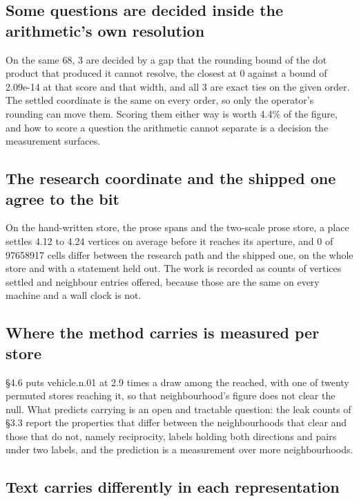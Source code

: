 \documentclass[10pt,letterpaper,twocolumn]{article}
\begin{document}
\subsection{Some questions are decided inside the arithmetic's own resolution}\label{some-questions-are-decided-inside-the-arithmetics-own-resolution}

On the same 68, 3 are decided by a gap that the rounding bound of the dot product that produced it
cannot resolve, the closest at 0 against a bound of 2.09e-14 at that score and that width, and all 3
are exact ties on the given order. The settled coordinate is the same on every order, so only the
operator's rounding can move them. Scoring them either way is worth 4.4\% of the figure, and how to score a question the
arithmetic cannot separate is a decision the measurement surfaces.

\subsection{The research coordinate and the shipped one agree to the bit}\label{the-research-coordinate-and-the-shipped-one-agree-to-the-bit}

On the hand-written store, the prose spans and the two-scale prose store, a place settles 4.12 to
4.24 vertices on average before it reaches its aperture, and 0 of 97658917 cells differ between the
research path and the shipped one, on the whole store and with a statement held out. The work is
recorded as counts of vertices settled and neighbour entries offered, because those are the same on
every machine and a wall clock is not.

\subsection{Where the method carries is measured per store}\label{where-the-method-carries-is-measured-per-store}

§4.6 puts vehicle.n.01 at 2.9 times a draw among the reached, with one of twenty permuted stores
reaching it, so that neighbourhood's figure does not clear the null. What predicts carrying is an
open and tractable question: the leak counts of §3.3 report the properties that differ between the
neighbourhoods that clear and those that do not, namely reciprocity, labels holding both directions
and pairs under two labels, and the prediction is a measurement over more neighbourhoods.

\subsection{Text carries differently in each representation}\label{text-carries-differently-in-each-representation}
\end{document}
